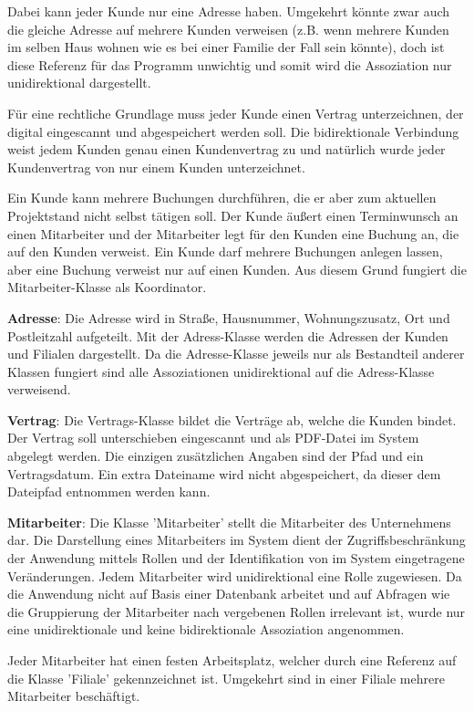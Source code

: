 Dabei kann jeder Kunde nur eine Adresse haben. Umgekehrt könnte zwar auch die gleiche Adresse auf mehrere Kunden verweisen (z.B. wenn mehrere Kunden im selben Haus wohnen wie es bei einer Familie der Fall sein könnte), doch ist diese Referenz für das Programm unwichtig und somit wird die Assoziation nur unidirektional dargestellt. 

Für eine rechtliche Grundlage muss jeder Kunde einen Vertrag unterzeichnen, der digital eingescannt und abgespeichert werden soll. Die bidirektionale Verbindung weist jedem Kunden genau einen Kundenvertrag zu und natürlich wurde jeder Kundenvertrag von nur einem Kunden unterzeichnet. 

Ein Kunde kann mehrere Buchungen durchführen, die er aber zum aktuellen Projektstand nicht selbst tätigen soll. Der Kunde äußert einen Terminwunsch an einen Mitarbeiter und der Mitarbeiter legt für den Kunden eine Buchung an, die auf den Kunden verweist. Ein Kunde darf mehrere Buchungen anlegen lassen, aber eine Buchung verweist nur auf einen Kunden. Aus diesem Grund fungiert die Mitarbeiter-Klasse als Koordinator.  

\textbf{Adresse}: Die Adresse wird in Straße, Hausnummer, Wohnungszusatz, Ort und Postleitzahl aufgeteilt. Mit der Adress-Klasse werden die Adressen der Kunden und Filialen dargestellt. Da die Adresse-Klasse jeweils nur als Bestandteil anderer Klassen fungiert sind alle Assoziationen unidirektional auf die Adress-Klasse verweisend. 

\textbf{Vertrag}: Die Vertrags-Klasse bildet die Verträge ab, welche die Kunden bindet. Der Vertrag soll unterschieben eingescannt und als PDF-Datei im System abgelegt werden. Die einzigen zusätzlichen Angaben sind der Pfad und ein Vertragsdatum. Ein extra Dateiname wird nicht abgespeichert, da dieser dem Dateipfad entnommen werden kann.

\textbf{Mitarbeiter}: Die Klasse 'Mitarbeiter' stellt die Mitarbeiter des Unternehmens dar. Die Darstellung eines Mitarbeiters im System dient der Zugriffsbeschränkung der Anwendung mittels Rollen und der Identifikation von im System eingetragene Veränderungen. Jedem Mitarbeiter wird unidirektional eine Rolle zugewiesen. Da die Anwendung nicht auf Basis einer Datenbank arbeitet und auf Abfragen wie die Gruppierung der Mitarbeiter nach vergebenen Rollen irrelevant ist, wurde nur eine unidirektionale und keine bidirektionale Assoziation angenommen.

Jeder Mitarbeiter hat einen festen Arbeitsplatz, welcher durch eine Referenz auf die Klasse 'Filiale' gekennzeichnet ist. Umgekehrt sind in einer Filiale mehrere Mitarbeiter beschäftigt. 

